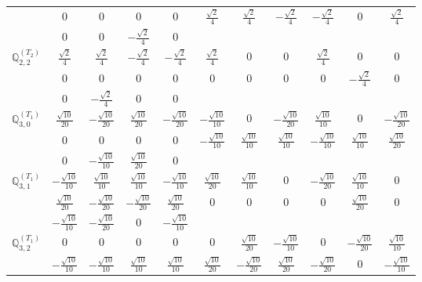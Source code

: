 \documentclass[fleqn,10pt,landscape]{article}
\begin{document}
\begin{itemize}
{\begin{center}
\begin{longtable}{ccccccccccc}
& $ 0 $ & $ 0 $ & $ 0 $ & $ 0 $ & $ \frac{\sqrt{2}}{4} $ & $ \frac{\sqrt{2}}{4} $ & $ - \frac{\sqrt{2}}{4} $ & $ - \frac{\sqrt{2}}{4} $ & $ 0 $ & $ \frac{\sqrt{2}}{4} $ \\
& $ 0 $ & $ 0 $ & $ - \frac{\sqrt{2}}{4} $ & $ 0 $ & $  $ & $  $ & $  $ & $  $ & $  $ & $  $ \\ \hline
$\mathbb{Q}_{2,2}^{(T_{2})}$ & $ \frac{\sqrt{2}}{4} $ & $ \frac{\sqrt{2}}{4} $ & $ - \frac{\sqrt{2}}{4} $ & $ - \frac{\sqrt{2}}{4} $ & $ \frac{\sqrt{2}}{4} $ & $ 0 $ & $ 0 $ & $ \frac{\sqrt{2}}{4} $ & $ 0 $ & $ 0 $ \\
& $ 0 $ & $ 0 $ & $ 0 $ & $ 0 $ & $ 0 $ & $ 0 $ & $ 0 $ & $ 0 $ & $ - \frac{\sqrt{2}}{4} $ & $ 0 $ \\
& $ 0 $ & $ - \frac{\sqrt{2}}{4} $ & $ 0 $ & $ 0 $ & $  $ & $  $ & $  $ & $  $ & $  $ & $  $ \\ \hline
$\mathbb{Q}_{3,0}^{(T_{1})}$ & $ \frac{\sqrt{10}}{20} $ & $ - \frac{\sqrt{10}}{20} $ & $ \frac{\sqrt{10}}{20} $ & $ - \frac{\sqrt{10}}{20} $ & $ - \frac{\sqrt{10}}{10} $ & $ 0 $ & $ - \frac{\sqrt{10}}{20} $ & $ \frac{\sqrt{10}}{10} $ & $ 0 $ & $ - \frac{\sqrt{10}}{20} $ \\
& $ 0 $ & $ 0 $ & $ 0 $ & $ 0 $ & $ - \frac{\sqrt{10}}{10} $ & $ \frac{\sqrt{10}}{10} $ & $ \frac{\sqrt{10}}{10} $ & $ - \frac{\sqrt{10}}{10} $ & $ \frac{\sqrt{10}}{10} $ & $ \frac{\sqrt{10}}{20} $ \\
& $ 0 $ & $ - \frac{\sqrt{10}}{10} $ & $ \frac{\sqrt{10}}{20} $ & $ 0 $ & $  $ & $  $ & $  $ & $  $ & $  $ & $  $ \\ \hline
$\mathbb{Q}_{3,1}^{(T_{1})}$ & $ - \frac{\sqrt{10}}{10} $ & $ \frac{\sqrt{10}}{10} $ & $ \frac{\sqrt{10}}{10} $ & $ - \frac{\sqrt{10}}{10} $ & $ \frac{\sqrt{10}}{20} $ & $ \frac{\sqrt{10}}{10} $ & $ 0 $ & $ - \frac{\sqrt{10}}{20} $ & $ \frac{\sqrt{10}}{10} $ & $ 0 $ \\
& $ \frac{\sqrt{10}}{20} $ & $ - \frac{\sqrt{10}}{20} $ & $ - \frac{\sqrt{10}}{20} $ & $ \frac{\sqrt{10}}{20} $ & $ 0 $ & $ 0 $ & $ 0 $ & $ 0 $ & $ \frac{\sqrt{10}}{20} $ & $ 0 $ \\
& $ - \frac{\sqrt{10}}{10} $ & $ - \frac{\sqrt{10}}{20} $ & $ 0 $ & $ - \frac{\sqrt{10}}{10} $ & $  $ & $  $ & $  $ & $  $ & $  $ & $  $ \\ \hline
$\mathbb{Q}_{3,2}^{(T_{1})}$ & $ 0 $ & $ 0 $ & $ 0 $ & $ 0 $ & $ 0 $ & $ \frac{\sqrt{10}}{20} $ & $ - \frac{\sqrt{10}}{10} $ & $ 0 $ & $ - \frac{\sqrt{10}}{20} $ & $ \frac{\sqrt{10}}{10} $ \\
& $ - \frac{\sqrt{10}}{10} $ & $ - \frac{\sqrt{10}}{10} $ & $ \frac{\sqrt{10}}{10} $ & $ \frac{\sqrt{10}}{10} $ & $ \frac{\sqrt{10}}{20} $ & $ - \frac{\sqrt{10}}{20} $ & $ \frac{\sqrt{10}}{20} $ & $ - \frac{\sqrt{10}}{20} $ & $ 0 $ & $ - \frac{\sqrt{10}}{10} $ \\

\end{longtable}
\end{center}}
\end{itemize}
\end{document}
